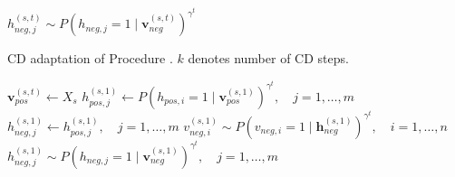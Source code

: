 \begin{algorithm}
\begin{algorithmic}[1]
				\State $h_{neg,j}^{(s,t)} \sim P(h_{neg,j} = 1 \mid \mathbf{v}_{neg}^{(s,t)})^{\gamma^t}$
			\EndFor
		\EndFor
	\EndFor
\EndProcedure
\end{algorithmic}
\end{algorithm}

\begin{algorithm}
\caption{CD adaptation of Procedure \label{alg:cd}. $k$ denotes number of CD steps.}
\begin{algorithmic}[1]
		\State $\mathbf{v}_{pos}^{(s,t)} \gets X_s$ 
		\State $h_{pos,j}^{(s,1)} \gets P(h_{pos,i} = 1 \mid \mathbf{v}_{pos}^{(s,1)})^{\gamma^t}, \quad j=1,\dots,m$ 
		\State $h_{neg,j}^{(s,1)} \gets h_{pos,j}^{(s,1)}, \quad j=1,\dots,m$  
			\State $v_{neg,i}^{(s,1)} \sim P(v_{neg,i} = 1 \mid \mathbf{h}_{neg}^{(s,1)})^{\gamma^t}, \quad i=1,\dots,n$ 
			\State $h_{neg,j}^{(s,1)} \sim P(h_{neg,j} = 1 \mid \mathbf{v}_{neg}^{(s,1)})^{\gamma^t}, \quad j=1,\dots,m$ 
		\EndFor
\end{algorithmic}
\end{algorithm}